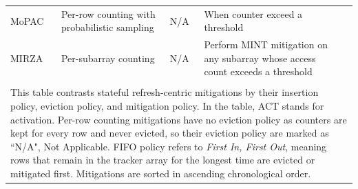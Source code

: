 \documentclass[journal,twocolumn]{IEEEtran}
\begin{document}
\begin{table}
\begin{tabular}{p{}p{}p{}p{}c}
		MoPAC & Per-row counting with probabilistic sampling & N/A & When counter exceed a threshold & \cite{Vittal25}
		\\
		MIRZA & Per-subarray counting & N/A & Perform MINT\cite{Qureshi24} mitigation on any subarray whose access count exceeds a threshold & \cite{Taneja26}
		\\
		\bottomrule
		\\
		\multicolumn{5}{p{2\columnwidth}}{This table contrasts stateful refresh-centric mitigations by their insertion policy, eviction policy, and mitigation policy. In the table, ACT stands for activation. Per-row counting mitigations have no eviction policy as counters are kept for every row and never evicted, so their eviction policy are marked as ``N/A", Not Applicable. FIFO policy refers to \textit{First In, First Out}, meaning rows that remain in the tracker array for the longest time are evicted or mitigated first. Mitigations are sorted in ascending chronological order.}
	\end{tabular}
\end{table}
\end{document}
